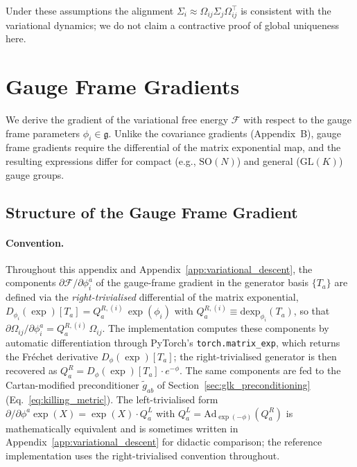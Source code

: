 \documentclass[twoside,11pt]{article}
\begin{document}
Under these assumptions the alignment $\Sigma_i \approx \Omega_{ij}\Sigma_j\Omega_{ij}^\top$ is consistent with the variational dynamics; we do not claim a contractive proof of global uniqueness here.


\section{Gauge Frame Gradients}
\label{app:phi_gradients}

We derive the gradient of the variational free energy $\mathcal{F}$ with respect to the gauge frame parameters $\phi_i \in \mathfrak{g}$. Unlike the covariance gradients (Appendix~B), gauge frame gradients require the differential of the matrix exponential map, and the resulting expressions differ for compact (e.g., $\mathrm{SO}(N)$) and general ($\mathrm{GL}(K)$) gauge groups.

\subsection{Structure of the Gauge Frame Gradient}

\paragraph{Convention.} Throughout this appendix and Appendix~\ref{app:variational_descent}, the components $\partial \mathcal{F}/\partial \phi_i^a$ of the gauge-frame gradient in the generator basis $\{T_a\}$ are defined via the \emph{right-trivialised} differential of the matrix exponential, $D_{\phi_i}(\exp)[T_a] = Q_a^{R,(i)}\,\exp(\phi_i)$ with $Q_a^{R,(i)} \equiv \mathrm{dexp}_{\phi_i}(T_a)$, so that $\partial \Omega_{ij}/\partial \phi_i^a = Q_a^{R,(i)}\,\Omega_{ij}$. The implementation computes these components by automatic differentiation through PyTorch's \texttt{torch.matrix\_exp}, which returns the Fr\'echet derivative $D_\phi(\exp)[T_a]$; the right-trivialised generator is then recovered as $Q_a^R = D_\phi(\exp)[T_a]\cdot e^{-\phi}$. The same components are fed to the Cartan-modified preconditioner $\tilde g_{ab}$ of Section~\ref{sec:glk_preconditioning} (Eq.~\ref{eq:killing_metric}). The left-trivialised form $\partial/\partial\phi^a \exp(X) = \exp(X)\cdot Q_a^L$ with $Q_a^L = \mathrm{Ad}_{\exp(-\phi)}(Q_a^R)$ is mathematically equivalent and is sometimes written in Appendix~\ref{app:variational_descent} for didactic comparison; the reference implementation uses the right-trivialised convention throughout.
\end{document}
